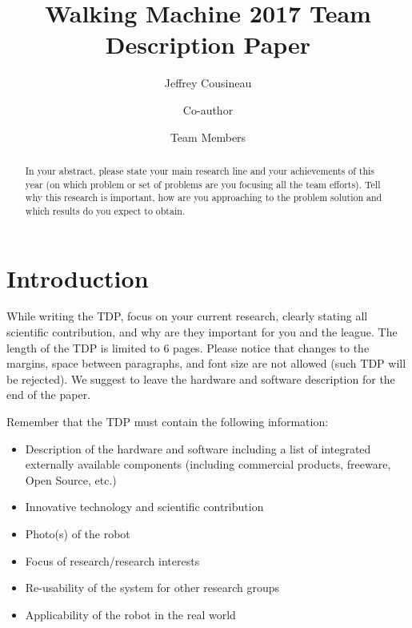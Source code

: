 \documentclass[runningheads,a4paper]{llncs}
\begin{document}
\title{Walking Machine 2017 Team Description Paper}

\author{Jeffrey Cousineau \and Co-author \and Team Members }
\maketitle



\begin{abstract}

In your abstract, please state your main research line and your achievements of this year (on which problem or set of problems are you focusing all the team efforts). Tell why this research is important, how are you approaching to the problem solution and which results do you expect to obtain.

\end{abstract}



\section{Introduction}
While writing the TDP, focus on your current research, clearly stating all scientific contribution, and why are they important for you and the league. The length of the TDP is limited to 6 pages. Please notice that changes to the margins, space between paragraphs, and font size are not allowed (such TDP will be rejected). We suggest to leave the hardware and software description for the end of the paper.

Remember that the TDP must contain the following information:

\begin{itemize}
	\item Description of the hardware and software including a list of integrated externally available components (including commercial products, freeware, Open Source, etc.)
	\item Innovative technology and scientific contribution
	\item Photo(s) of the robot
	\item Focus of research/research interests
	\item Re-usability of the system for other research groups
	\item Applicability of the robot in the real world
\end{itemize}
\end{document}
